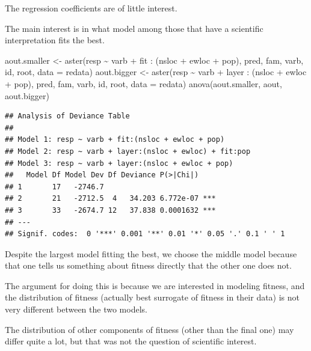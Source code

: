 \documentclass[
  ignorenonframetext,
]{beamer}
\newenvironment{Shaded}{\begin{snugshade}}{\end{snugshade}}
\newcommand{\AttributeTok}[1]{\textcolor[rgb]{0.77,0.63,0.00}{#1}}
\newcommand{\FunctionTok}[1]{\textcolor[rgb]{0.00,0.00,0.00}{#1}}
\newcommand{\NormalTok}[1]{#1}
\newcommand{\OtherTok}[1]{\textcolor[rgb]{0.56,0.35,0.01}{#1}}
\newcommand{\SpecialCharTok}[1]{\textcolor[rgb]{0.00,0.00,0.00}{#1}}
\begin{document}
\begin{frame}[fragile]{}
\protect\hypertarget{section-20}{}
The regression coefficients are of little interest.

The main interest is in what model among those that have a scientific
interpretation fits the best.

\vspace{12pt}
\tiny

\begin{Shaded}
\begin{Highlighting}[]
\NormalTok{aout.smaller }\OtherTok{\textless{}{-}} \FunctionTok{aster}\NormalTok{(resp }\SpecialCharTok{\textasciitilde{}}\NormalTok{ varb }\SpecialCharTok{+} 
\NormalTok{  fit }\SpecialCharTok{:}\NormalTok{ (nsloc }\SpecialCharTok{+}\NormalTok{ ewloc }\SpecialCharTok{+}\NormalTok{ pop), }
\NormalTok{  pred, fam, varb, id, root, }\AttributeTok{data =}\NormalTok{ redata)}
\NormalTok{aout.bigger }\OtherTok{\textless{}{-}} \FunctionTok{aster}\NormalTok{(resp }\SpecialCharTok{\textasciitilde{}}\NormalTok{ varb }\SpecialCharTok{+} 
\NormalTok{  layer }\SpecialCharTok{:}\NormalTok{ (nsloc }\SpecialCharTok{+}\NormalTok{ ewloc }\SpecialCharTok{+}\NormalTok{ pop), }
\NormalTok{  pred, fam, varb, id, root, }\AttributeTok{data =}\NormalTok{ redata)}
\FunctionTok{anova}\NormalTok{(aout.smaller, aout, aout.bigger)}
\end{Highlighting}
\end{Shaded}

\begin{verbatim}
## Analysis of Deviance Table
## 
## Model 1: resp ~ varb + fit:(nsloc + ewloc + pop)
## Model 2: resp ~ varb + layer:(nsloc + ewloc) + fit:pop
## Model 3: resp ~ varb + layer:(nsloc + ewloc + pop)
##   Model Df Model Dev Df Deviance P(>|Chi|)    
## 1       17   -2746.7                          
## 2       21   -2712.5  4   34.203 6.772e-07 ***
## 3       33   -2674.7 12   37.838 0.0001632 ***
## ---
## Signif. codes:  0 '***' 0.001 '**' 0.01 '*' 0.05 '.' 0.1 ' ' 1
\end{verbatim}
\end{frame}

\begin{frame}{}
\protect\hypertarget{section-21}{}
Despite the largest model fitting the best, we choose the middle model
because that one tells us something about fitness directly that the
other one does not.

The argument for doing this is because we are interested in modeling
fitness, and the distribution of fitness (actually best surrogate of
fitness in their data) is not very different between the two models.

The distribution of other components of fitness (other than the final
one) may differ quite a lot, but that was not the question of scientific
interest.
\end{frame}
\end{document}
